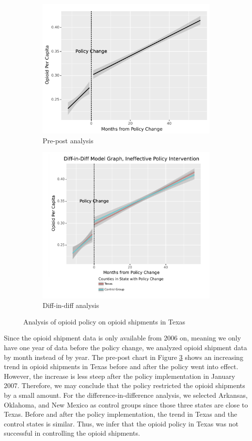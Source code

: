 \documentclass[12pt,letterpaper]{article}
\begin{document}
\begin{figure}[!h]
\centering
\begin{subfigure}{.5\textwidth}
  \centering
  \includegraphics[width=0.7\linewidth]{../30_results/Bonus_Results/tx_monthly_prepost_successful.png}
  \caption{Pre-post analysis}
  \label{fig:tx_ship_prepost}
\end{subfigure}%
\begin{subfigure}{.55\textwidth}
  \centering
  \includegraphics[width=0.7\linewidth]{../30_results/Bonus_Results/tx_monthly_did_notsure.png}
  \caption{Diff-in-diff analysis}
  \label{fig:tx_ship_did}
\end{subfigure}
\caption{Analysis of opioid policy on opioid shipments in Texas}
\label{fig:tx_ship}
\end{figure}
Since the opioid shipment data is only available from 2006 on, meaning we only have one year of data before the policy change, we analyzed opioid shipment data by month instead of by year. The pre-post chart in Figure \ref{fig:tx_ship} shows an increasing trend in opioid shipments in Texas before and after the policy went into effect. However, the increase is less steep after the policy implementation in January 2007. Therefore, we may conclude that the policy restricted the opioid shipments by a small amount. For the difference-in-difference analysis, we selected Arkansas, Oklahoma, and New Mexico as control groups since those three states are close to Texas. Before and after the policy implementation, the trend in Texas and the control states is similar. Thus, we infer that the opioid policy in Texas was not successful in controlling the opioid shipments. \\
\end{document}
